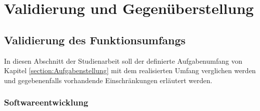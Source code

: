 
\chapter{Validierung und Gegenüberstellung}

\section{Validierung des Funktionsumfangs}

In diesen Abschnitt der Studienarbeit soll der definierte Aufgabenumfang von Kapitel \ref{section:Aufgabenstellung} mit dem realisierten Umfang verglichen werden und gegebenenfalls vorhandende Einschränkungen erläutert werden.

\subsection{Softwareentwicklung}



